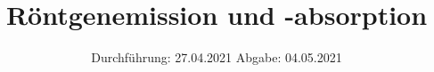 

\subject{V602}
\title{Röntgenemission und -absorption}
\date{%
  Durchführung: 27.04.2021
  \hspace{3em}
  Abgabe: 04.05.2021
}



\maketitle
\thispagestyle{empty}
\tableofcontents
\newpage





\nocite{*}
\printbibliography{}


